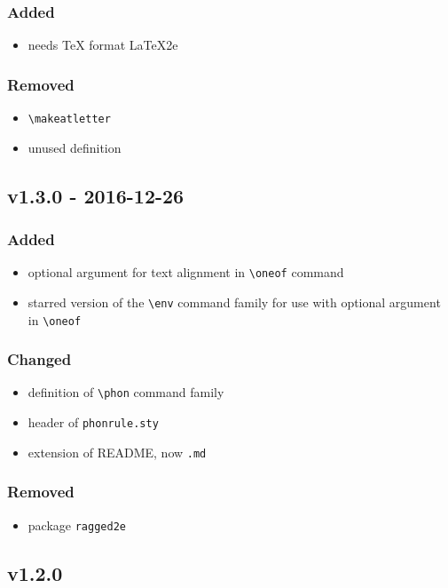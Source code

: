 \documentclass[a4paper]{article}
\begin{document}
\subsubsection*{Added}
\begin{itemize}
    \item needs \TeX{} format \LaTeX2e
\end{itemize}
\subsubsection*{Removed}
\begin{itemize}
    \item \verb+\makeatletter+
    \item unused definition
\end{itemize}

\subsection*{v1.3.0 - 2016-12-26}
\subsubsection*{Added}
\begin{itemize}
    \item optional argument for text alignment in \verb+\oneof+ command
    \item starred version of the \verb+\env+ command family for use with optional argument in \verb+\oneof+
\end{itemize}
\subsubsection*{Changed}
\begin{itemize}
    \item definition of \verb+\phon+ command family
    \item header of \texttt{phonrule.sty}
    \item extension of README, now \texttt{.md}
\end{itemize}
\subsubsection*{Removed}
\begin{itemize}
    \item package \texttt{ragged2e}
\end{itemize}

\subsection*{v1.2.0}
\end{document}
